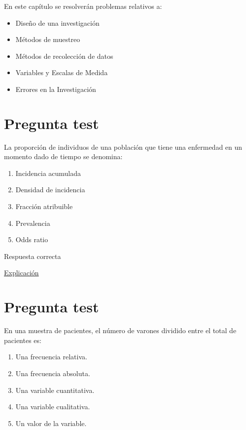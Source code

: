 \documentclass[
]{book}
\providecommand{\tightlist}{%
  \setlength{\itemsep}{0pt}\setlength{\parskip}{0pt}}
\begin{document}
En este capítulo se resolverán problemas relativos a:

\begin{itemize}
\tightlist
\item
  Diseño de una investigación
\item
  Métodos de muestreo
\item
  Métodos de recolección de datos
\item
  Variables y Escalas de Medida
\item
  Errores en la Investigación
\end{itemize}

\hypertarget{pregunta-test}{%
\section{Pregunta test}\label{pregunta-test}}

La proporción de individuos de una población que tiene una enfermedad en un momento dado de tiempo se denomina:

\begin{enumerate}
\def\labelenumi{\alph{enumi})}
\tightlist
\item
  Incidencia acumulada
\item
  Densidad de incidencia
\item
  Fracción atribuible
\item
  Prevalencia
\item
  Odds ratio
\end{enumerate}

Respuesta correcta

\href{https://www.cancer.gov/espanol/publicaciones/diccionarios/diccionario-cancer/def/prevalencia}{Explicación}

\hypertarget{pregunta-test-1}{%
\section{Pregunta test}\label{pregunta-test-1}}

En una muestra de pacientes, el número de varones dividido entre el total de pacientes es:

\begin{enumerate}
\def\labelenumi{\alph{enumi})}
\tightlist
\item
  Una frecuencia relativa.
\item
  Una frecuencia absoluta.
\item
  Una variable cuantitativa.
\item
  Una variable cualitativa.
\item
  Un valor de la variable.
\end{enumerate}
\end{document}
